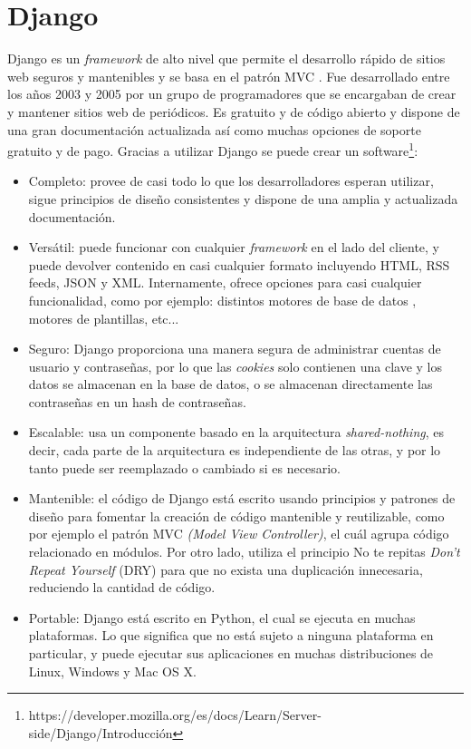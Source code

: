 \section{Django}
\label{cap:sec:django}
Django es un \textit{framework} de alto nivel que permite el desarrollo rápido de sitios web seguros y mantenibles y se basa en el patrón MVC \citep{TFGEmociones}. Fue desarrollado entre los años 2003 y 2005 por un grupo de programadores que se encargaban de crear y mantener sitios web de periódicos. 
Es gratuito y de código abierto y dispone de una gran documentación actualizada así como muchas opciones de soporte gratuito y de pago. Gracias a utilizar Django se puede crear un software\footnote{https://developer.mozilla.org/es/docs/Learn/Server-side/Django/Introducción}:
\begin{itemize}
	\item Completo: provee de casi todo lo que los desarrolladores esperan utilizar, sigue principios de diseño consistentes y dispone de una amplia y actualizada documentación.
	\item Versátil: puede funcionar con cualquier \textit{framework} en el lado del cliente, y puede devolver contenido en casi cualquier formato incluyendo HTML, RSS feeds, JSON y XML. Internamente, ofrece opciones para casi cualquier funcionalidad, como por ejemplo: distintos motores de base de datos , motores de plantillas, etc...
	\item Seguro: Django proporciona una manera segura de administrar cuentas de usuario y contraseñas, por lo que las \textit{cookies} solo contienen una clave y los datos se almacenan en la base de datos, o se almacenan directamente las contraseñas en un hash de contraseñas.
	\item Escalable: usa un componente basado en la arquitectura \textit{shared-nothing}, es decir, cada parte de la arquitectura es independiente de las otras, y por lo tanto puede ser reemplazado o cambiado si es necesario.
	\item Mantenible: el código de Django está escrito usando principios y patrones de diseño para fomentar la creación de código mantenible y reutilizable, como por ejemplo el patrón MVC \textit{(Model View Controller)}, el cuál agrupa código relacionado en módulos.  Por otro lado, utiliza el principio No te repitas \textit{Don't Repeat Yourself} (DRY) para que no exista una duplicación innecesaria, reduciendo la cantidad de código. 
	\item Portable: Django está escrito en Python, el cual se ejecuta en muchas plataformas. Lo que significa que no está sujeto a ninguna plataforma en particular, y puede ejecutar sus aplicaciones en muchas distribuciones de Linux, Windows y Mac OS X.
\end{itemize}

